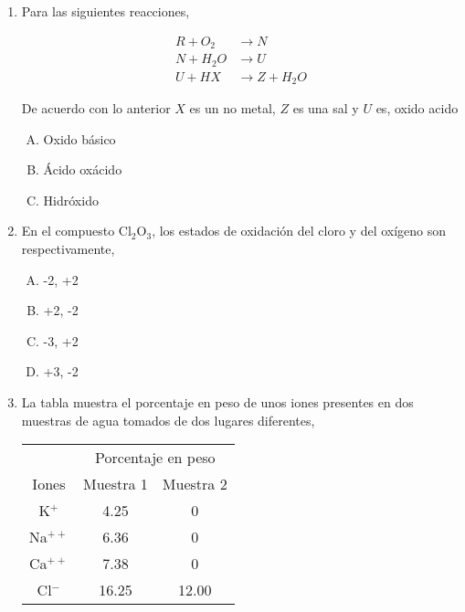 \begin{enumerate}


\item  Para las siguientes reacciones, \label{jenn-16}

\begin{align*}
R+O_{2}&\longrightarrow N\\
N+H_{2}O&\longrightarrow U\\
U+HX&\longrightarrow Z+H_{2}O
\end{align*}

De acuerdo con lo anterior $X$ es un no metal, $Z$ es una sal y $U$ es, oxido acido

\begin{enumerate}[(A)]
\item   Oxido básico
\item Ácido oxácido
\item Hidróxido
\end{enumerate}




\item En el compuesto Cl$_2$O$_3$, los estados de oxidación del cloro y del oxígeno son respectivamente, \label{jenn-17}


\begin{enumerate}[(A)]
\item   -2, +2   
\item +2, -2                         
\item -3, +2    
\item   +3, -2
\end{enumerate}




\item  La tabla muestra el porcentaje en peso de unos iones presentes en dos muestras de agua tomados de dos lugares diferentes,\label{jenn-18}

\begin{center}
\begin{tabular}{c|cc}
\hline 
\hline 
 & \multicolumn{2}{c}{Porcentaje en peso}   \\ 
Iones & Muestra 1 & Muestra 2 \\ 
\hline 
\hline 
K$^{+}$ & 4.25 & 0 \\		 
Na$^{++}$ & 6.36 & 0 \\ 
Ca$^{++}$ & 7.38 & 0 \\ 
Cl$^{-}$ & 16.25 & 12.00 \\ 
\hline 
\end{tabular} 
\end{center}


\end{enumerate}
